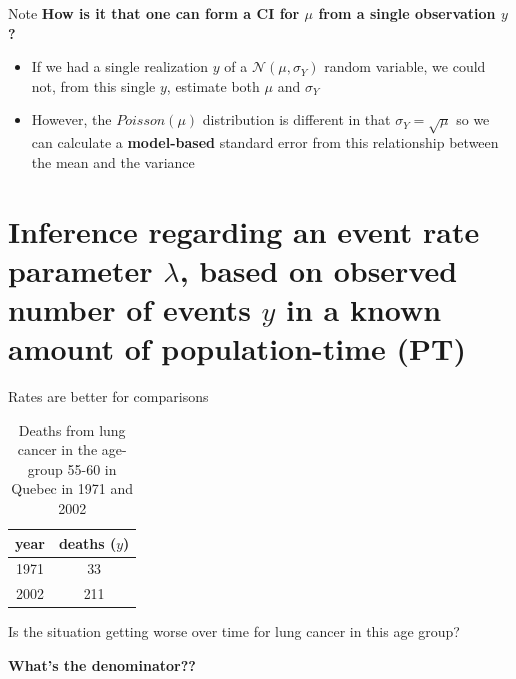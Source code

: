 \documentclass[10pt,handout]{beamer}\usepackage[]{graphicx}\usepackage[]{color}
\begin{document}
\begin{frame}{Note}
	\textbf{How is it that one can form a CI for $\mu$ from a single observation $y$?}
	\vspace{0.2in}
	\pause
	\begin{itemize}
		\item If we had a single realization $y$ of a $\mathcal{N}(\mu, \sigma_{Y})$ random variable, we could not,
		from this single $y$, estimate both $\mu$ and $\sigma_{Y}$
		\item However, the $Poisson(\mu)$ distribution is different in that $\sigma_{Y} = \sqrt{\mu}$ so we can calculate a \textbf{model-based} standard error from this relationship between the mean and the variance
	\end{itemize}
	
\end{frame}


\section{Inference regarding an event rate parameter $\lambda$, based on observed number of events $y$ in a known amount of population-time (PT)}

\begin{frame}{Rates are better for comparisons}
	
	
	\begin{table}
		\centering
		\begin{tabular}{cc}
			year & deaths ($y$) \\
			\hline
			1971 & 33 \\
			2002 & 211 \\
			\hline
		\end{tabular}
		\caption{Deaths from lung cancer in the age-group 55-60 in Quebec in 1971 and 2002}
	\end{table} 
	
	\pause 
	
	 Is the situation getting worse over time for lung cancer in this age group?
	\pause
	
	\vspace*{0.5in}
	
	 \textbf{What's the denominator??}
	
	
\end{frame} 



\begin{frame}
\end{frame}
\end{document}
